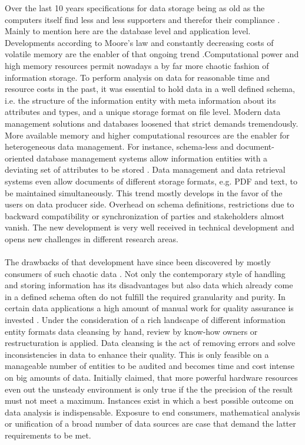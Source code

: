Over the last 10 years specifications for data storage being as old as the computers itself find less and less supporters and therefor their compliance \cite{andlinger_2013}. Mainly to mention here are the database level and application level. Developments according to Moore's law \cite[p. 7ff, p. 87ff]{brock_2006} and constantly decreasing  costs of volatile memory are the enabler of that ongoing trend \cite{rhines_2016}.Computational power and high memory resources permit nowadays a by far more chaotic fashion of information storage. To perform analysis on data for reasonable time and resource costs in the past, it was essential to hold data in a well defined schema, i.e. the structure of the information entity with meta information about its attributes and types, and a unique storage format on file level. Modern data management solutions and databases loosened that strict demands tremendously. More available memory and higher computational resources are the enabler for heterogeneous data management. For instance, schema-less and document-oriented database management systems allow information entities with a deviating set of attributes to be stored \cite{hills_2016}. Data management and data retrieval systems even allow documents of different storage formats, e.g. PDF and text, to be maintained simultaneously. This trend mostly develops in the favor of the users on data producer side. Overhead on schema definitions, restrictions due to backward compatibility or synchronization of parties and stakeholders almost vanish. The new development is very well received in technical development and opens new challenges in different research areas.
\\\\
The drawbacks of that development have since been discovered by mostly consumers of such chaotic data \cite{lombardo_di_nitto_ardagna_2012}. Not only the contemporary style of handling and storing information has its disadvantages but also data which already come in a defined schema often do not fulfill the required granularity and purity. In certain data applications a high amount of manual work for quality assurance is invested \cite{wang_strong_1996}. Under the consideration of a rich landscape of different information entity formats data cleansing by hand, review by know-how owners or restructuration is applied. Data cleansing is the act of removing errors and solve inconsistencies in data to enhance their quality. This is only feasible on a manageable number of entities to be audited and becomes time and cost intense on big amounts of data. Initially claimed, that more powerful hardware resources even out the unsteady environment is only true if the the precision of the result must not meet a maximum. Instances exist in which a best possible outcome on data analysis is indispensable. Exposure to end consumers, mathematical analysis or unification of a broad number of data sources are case that demand the latter requirements to be met. 

